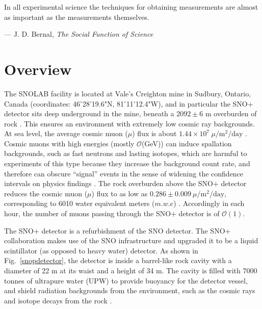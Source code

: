 \setlength{\epigraphwidth}{0.5\textwidth}
\epigraph{In all experimental science the techniques for obtaining measurements are almost as important as the measurements themselves.}{--- \textup{J. D. Bernal}, \textit{The Social Function of Science}}

\section{Overview}\label{sect:overview}

The SNOLAB facility is located at Vale's Creighton mine in Sudbury, Ontario, Canada (coordinates: 46$^\circ$28'19.6"N, 81$^\circ$11'12.4"W), and in particular the SNO+ detector sits deep underground in the mine, beneath a $2092\pm6$ m overburden of rock \cite{snop_jinst,snolabuserhandbook}. This ensures an environment with extremely low cosmic ray backgrounds. At sea level, the average cosmic muon ($\mu$) flux is about $1.44\times 10^7~\mu/\mathrm{m^2/day}$ \cite{muonflux}. Cosmic muons with high energies (mostly $\mathcal{O}$(GeV)) can induce spallation backgrounds, such as fast neutrons and lasting isotopes, which are harmful to experiments of this type because they increase the background count rate, and therefore can obscure ``signal'' events in the sense of widening the confidence intervals on physics findings \cite{beacom2017physics}. The rock overburden above the SNO+ detector reduces the cosmic muon ($\mu$) flux to as low as $0.286\pm0.009~\mu/\mathrm{m^2/day}$, corresponding to 6010 water equivalent meters ($m.w.e$) \cite{snop_jinst}. Accordingly in each hour, the number of muons passing through the SNO+ detector is of $\mathcal{O}(1)$.

The SNO+ detector is a refurbishment of the SNO detector. The SNO+ collaboration makes use of the SNO infrastructure and upgraded it to be a liquid scintillator (as opposed to heavy water) detector. As shown in Fig.~\ref{snopdetector}, the detector is inside a barrel-like rock cavity with a diameter of 22 m at its waist and a height of 34 m. The cavity is filled with 7000 tonnes of ultrapure water (UPW) to provide buoyancy for the detector vessel, and shield radiation backgrounds from the environment, such as the cosmic rays and isotope decays from the rock \cite{snop_jinst}.

